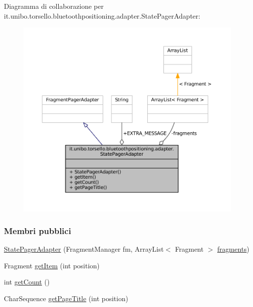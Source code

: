 Diagramma di collaborazione per it.\+unibo.\+torsello.\+bluetoothpositioning.\+adapter.\+State\+Pager\+Adapter\+:
\nopagebreak
\begin{figure}[H]
\begin{center}
\leavevmode
\includegraphics[width=350pt]{classit_1_1unibo_1_1torsello_1_1bluetoothpositioning_1_1adapter_1_1StatePagerAdapter__coll__graph}
\end{center}
\end{figure}
\subsubsection*{Membri pubblici}
\begin{DoxyCompactItemize}
\item 
\hyperlink{classit_1_1unibo_1_1torsello_1_1bluetoothpositioning_1_1adapter_1_1StatePagerAdapter_afd334cc5759e5d948cc53f04e3b595dc_afd334cc5759e5d948cc53f04e3b595dc}{State\+Pager\+Adapter} (Fragment\+Manager fm, Array\+List$<$ Fragment $>$ \hyperlink{classit_1_1unibo_1_1torsello_1_1bluetoothpositioning_1_1adapter_1_1StatePagerAdapter_a6d30ff8266b65b268d46d03eb30da1db_a6d30ff8266b65b268d46d03eb30da1db}{fragments})
\item 
Fragment \hyperlink{classit_1_1unibo_1_1torsello_1_1bluetoothpositioning_1_1adapter_1_1StatePagerAdapter_adf00793e6ddb9d5f76a2cd0864fefdf7_adf00793e6ddb9d5f76a2cd0864fefdf7}{get\+Item} (int position)
\item 
int \hyperlink{classit_1_1unibo_1_1torsello_1_1bluetoothpositioning_1_1adapter_1_1StatePagerAdapter_a1c5ec6f7db18de1637281966fae2e0b7_a1c5ec6f7db18de1637281966fae2e0b7}{get\+Count} ()
\item 
Char\+Sequence \hyperlink{classit_1_1unibo_1_1torsello_1_1bluetoothpositioning_1_1adapter_1_1StatePagerAdapter_a4b870f525968be40d114258681e2ddc2_a4b870f525968be40d114258681e2ddc2}{get\+Page\+Title} (int position)
\end{DoxyCompactItemize}
